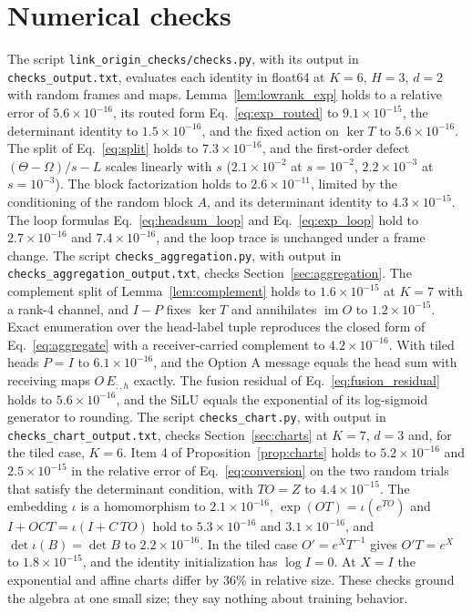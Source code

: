 \documentclass[11pt]{article}
\theoremstyle{definition}
\theoremstyle{remark}
\newcommand{\im}{\operatorname{im}}
\begin{document}
\section{Numerical checks}
\label{sec:checks}

The script \texttt{link\_origin\_checks/checks.py}, with its output in \texttt{checks\_output.txt}, evaluates each identity in float64 at $K=6$, $H=3$, $d=2$ with random frames and maps. Lemma~\ref{lem:lowrank_exp} holds to a relative error of $5.6\times10^{-16}$, its routed form Eq.~\eqref{eq:exp_routed} to $9.1\times10^{-15}$, the determinant identity to $1.5\times10^{-16}$, and the fixed action on $\ker T$ to $5.6\times10^{-16}$. The split of Eq.~\eqref{eq:split} holds to $7.3\times10^{-16}$, and the first-order defect $(\Theta-\Omega)/s-L$ scales linearly with $s$ ($2.1\times10^{-2}$ at $s=10^{-2}$, $2.2\times10^{-3}$ at $s=10^{-3}$). The block factorization holds to $2.6\times10^{-11}$, limited by the conditioning of the random block $A$, and its determinant identity to $4.3\times10^{-15}$. The loop formulas Eq.~\eqref{eq:headsum_loop} and Eq.~\eqref{eq:exp_loop} hold to $2.7\times10^{-16}$ and $7.4\times10^{-16}$, and the loop trace is unchanged under a frame change. The script \texttt{checks\_aggregation.py}, with output in \texttt{checks\_aggregation\_output.txt}, checks Section~\ref{sec:aggregation}. The complement split of Lemma~\ref{lem:complement} holds to $1.6\times10^{-15}$ at $K=7$ with a rank-4 channel, and $I-P$ fixes $\ker T$ and annihilates $\im O$ to $1.2\times10^{-15}$. Exact enumeration over the head-label tuple reproduces the closed form of Eq.~\eqref{eq:aggregate} with a receiver-carried complement to $4.2\times10^{-16}$. With tiled heads $P=I$ to $6.1\times10^{-16}$, and the Option A message equals the head sum with receiving maps $O\,E_{:,h}$ exactly. The fusion residual of Eq.~\eqref{eq:fusion_residual} holds to $5.6\times10^{-16}$, and the SiLU equals the exponential of its log-sigmoid generator to rounding. The script \texttt{checks\_chart.py}, with output in \texttt{checks\_chart\_output.txt}, checks Section~\ref{sec:charts} at $K=7$, $d=3$ and, for the tiled case, $K=6$. Item 4 of Proposition~\ref{prop:charts} holds to $5.2\times10^{-16}$ and $2.5\times10^{-15}$ in the relative error of Eq.~\eqref{eq:conversion} on the two random trials that satisfy the determinant condition, with $TO=Z$ to $4.4\times10^{-15}$. The embedding $\iota$ is a homomorphism to $2.1\times10^{-16}$, $\exp(OT)=\iota(e^{TO})$ and $I+OCT=\iota(I+C\,TO)$ hold to $5.3\times10^{-16}$ and $3.1\times10^{-16}$, and $\det\iota(B)=\det B$ to $2.2\times10^{-16}$. In the tiled case $O'=e^{X}T^{-1}$ gives $O'T=e^{X}$ to $1.8\times10^{-15}$, and the identity initialization has $\log I=0$. At $X=I$ the exponential and affine charts differ by $36\%$ in relative size. These checks ground the algebra at one small size; they say nothing about training behavior.
\end{document}
